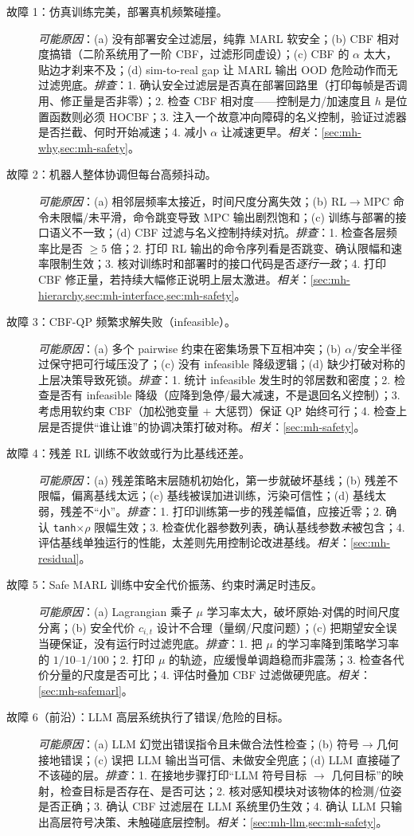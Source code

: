 \begin{description}
  \item[故障 1：仿真训练完美，部署真机频繁碰撞。] \emph{可能原因}：(a) 没有部署安全过滤层，纯靠 MARL 软安全；(b) CBF 相对度搞错（二阶系统用了一阶 CBF，过滤形同虚设）；(c) CBF 的 $\alpha$ 太大，贴边才刹来不及；(d) sim-to-real gap 让 MARL 输出 OOD 危险动作而无过滤兜底。\emph{排查}：1. 确认安全过滤层是否真在部署回路里（打印每帧是否调用、修正量是否非零）；2. 检查 CBF 相对度——控制是力/加速度且 $h$ 是位置函数则必须 HOCBF；3. 注入一个故意冲向障碍的名义控制，验证过滤器是否拦截、何时开始减速；4. 减小 $\alpha$ 让减速更早。\emph{相关}：\cref{sec:mh-why,sec:mh-safety}。
  \item[故障 2：机器人整体协调但每台高频抖动。] \emph{可能原因}：(a) 相邻层频率太接近，时间尺度分离失效；(b) RL$\to$MPC 命令未限幅/未平滑，命令跳变导致 MPC 输出剧烈饱和；(c) 训练与部署的接口语义不一致；(d) CBF 过滤与名义控制持续对抗。\emph{排查}：1. 检查各层频率比是否 $\ge5$ 倍；2. 打印 RL 输出的命令序列看是否跳变、确认限幅和速率限制生效；3. 核对训练时和部署时的接口代码是否\emph{逐行一致}；4. 打印 CBF 修正量，若持续大幅修正说明上层太激进。\emph{相关}：\cref{sec:mh-hierarchy,sec:mh-interface,sec:mh-safety}。
  \item[故障 3：CBF-QP 频繁求解失败（infeasible）。] \emph{可能原因}：(a) 多个 pairwise 约束在密集场景下互相冲突；(b) $\alpha$/安全半径过保守把可行域压没了；(c) 没有 infeasible 降级逻辑；(d) 缺少打破对称的上层决策导致死锁。\emph{排查}：1. 统计 infeasible 发生时的邻居数和密度；2. 检查是否有 infeasible 降级（应降到急停/最大减速，不是退回名义控制）；3. 考虑用软约束 CBF（加松弛变量 $+$ 大惩罚）保证 QP 始终可行；4. 检查上层是否提供“谁让谁”的协调决策打破对称。\emph{相关}：\cref{sec:mh-safety}。
  \item[故障 4：残差 RL 训练不收敛或行为比基线还差。] \emph{可能原因}：(a) 残差策略末层随机初始化，第一步就破坏基线；(b) 残差不限幅，偏离基线太远；(c) 基线被误加进训练，污染可信性；(d) 基线太弱，残差不“小”。\emph{排查}：1. 打印训练第一步的残差幅值，应接近零；2. 确认 \texttt{tanh}$\times\rho$ 限幅生效；3. 检查优化器参数列表，确认基线参数\emph{未}被包含；4. 评估基线单独运行的性能，太差则先用控制论改进基线。\emph{相关}：\cref{sec:mh-residual}。
  \item[故障 5：Safe MARL 训练中安全代价振荡、约束时满足时违反。] \emph{可能原因}：(a) Lagrangian 乘子 $\mu$ 学习率太大，破坏原始-对偶的时间尺度分离；(b) 安全代价 $c_{i,t}$ 设计不合理（量纲/尺度问题）；(c) 把期望安全误当硬保证，没有运行时过滤兜底。\emph{排查}：1. 把 $\mu$ 的学习率降到策略学习率的 $1/10$--$1/100$；2. 打印 $\mu$ 的轨迹，应缓慢单调趋稳而非震荡；3. 检查各代价分量的尺度是否可比；4. 评估时叠加 CBF 过滤做硬兜底。\emph{相关}：\cref{sec:mh-safemarl}。
  \item[故障 6（前沿）：LLM 高层系统执行了错误/危险的目标。] \emph{可能原因}：(a) LLM 幻觉出错误指令且未做合法性检查；(b) 符号$\to$几何接地错误；(c) 误把 LLM 输出当可信、未做安全兜底；(d) LLM 直接碰了不该碰的层。\emph{排查}：1. 在接地步骤打印“LLM 符号目标 $\to$ 几何目标”的映射，检查目标是否存在、是否可达；2. 核对感知模块对该物体的检测/位姿是否正确；3. 确认 CBF 过滤层在 LLM 系统里仍生效；4. 确认 LLM 只输出高层符号决策、未触碰底层控制。\emph{相关}：\cref{sec:mh-llm,sec:mh-safety}。
\end{description}
